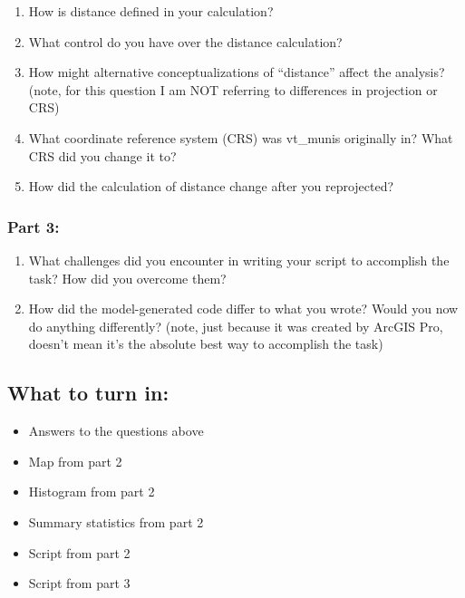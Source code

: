 \documentclass[
]{article}
\providecommand{\tightlist}{%
  \setlength{\itemsep}{0pt}\setlength{\parskip}{0pt}}
\begin{document}
\begin{enumerate}
\def\labelenumi{\arabic{enumi}.}
\tightlist
\item
  How is distance defined in your calculation?
\item
  What control do you have over the distance calculation?
\item
  How might alternative conceptualizations of ``distance'' affect the
  analysis? (note, for this question I am NOT referring to differences
  in projection or CRS)
\item
  What coordinate reference system (CRS) was vt\_munis originally in?
  What CRS did you change it to?
\item
  How did the calculation of distance change after you reprojected?
\end{enumerate}

\hypertarget{part-3}{%
\subsubsection{Part 3:}\label{part-3}}

\begin{enumerate}
\def\labelenumi{\arabic{enumi}.}
\setcounter{enumi}{5}
\tightlist
\item
  What challenges did you encounter in writing your script to accomplish
  the task? How did you overcome them?
\item
  How did the model-generated code differ to what you wrote? Would you
  now do anything differently? (note, just because it was created by
  ArcGIS Pro, doesn't mean it's the absolute best way to accomplish the
  task)
\end{enumerate}

\hypertarget{what-to-turn-in}{%
\subsection{What to turn in:}\label{what-to-turn-in}}

\begin{itemize}
\tightlist
\item
  Answers to the questions above
\item
  Map from part 2
\item
  Histogram from part 2
\item
  Summary statistics from part 2
\item
  Script from part 2
\item
  Script from part 3
\end{itemize}
\end{document}
